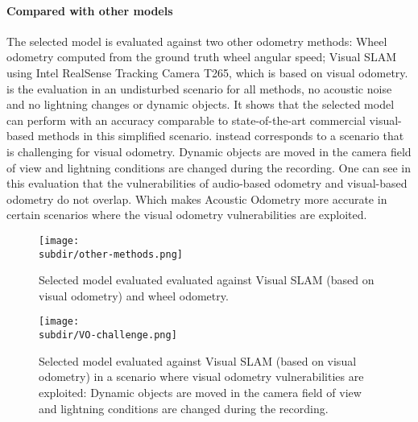 \paragraph{Compared with other models} The selected model is evaluated against
two other odometry methods: Wheel odometry computed from the ground truth wheel
angular speed; Visual SLAM using Intel\textregistered{}
RealSense\texttrademark{} Tracking Camera T265, which is based on visual
odometry.  is the evaluation in an undisturbed scenario
for all methods, no acoustic noise and no lightning changes or dynamic objects.
It shows that the selected model can perform with an accuracy comparable to
state-of-the-art commercial visual-based methods in this simplified scenario.
 instead corresponds to a scenario that is challenging
for visual odometry. Dynamic objects are moved in the camera field of view and
lightning conditions are changed during the recording. One can see in this
evaluation that the vulnerabilities of audio-based odometry and visual-based
odometry do not overlap. Which makes Acoustic Odometry more accurate in certain
scenarios where the visual odometry vulnerabilities are exploited.

\begin{figure}
    \centering
    \texttt{[image: \\subdir/other-methods.png]}
    \caption[Selected model compared to other methods]{Selected model evaluated
        evaluated against Visual SLAM (based on visual odometry) and wheel
        odometry.}
    \label{fig:other-methods}
\end{figure}

\begin{figure}
    \centering
    \texttt{[image: \\subdir/VO-challenge.png]}
    \caption[Selected model on a challenging scenario for Visual Odometry]{
        Selected model evaluated against Visual SLAM (based on visual odometry)
        in a scenario where visual odometry vulnerabilities are exploited:
        Dynamic objects are moved in the camera field of view and lightning
        conditions are changed during the recording.}
    \label{fig:VO-challenge}
\end{figure}

